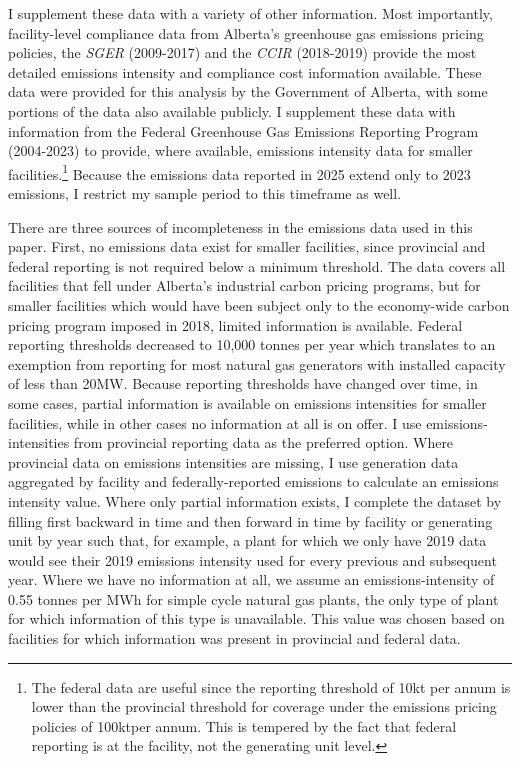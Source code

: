 \documentclass[12pt]{article}
\newcommand{\SGER}{\textit{SGER} }
\newcommand{\CCIR}{\textit{CCIR} }
\newcommand{\coe}{\text{CO$_2$e}}
\begin{document}
I supplement these data with a variety of other information.  Most importantly, facility-level compliance data from Alberta's greenhouse gas emissions pricing policies, the \SGER (2009-2017) and the \CCIR (2018-2019) provide the most detailed emissions intensity and compliance cost information available. These data were provided for this analysis by the Government of Alberta, with some portions of the data also available publicly. I supplement these data with information from the Federal Greenhouse Gas Emissions Reporting Program (2004-2023) to provide, where available, emissions intensity data for smaller facilities.\footnote{The federal data are useful since the reporting threshold of 10kt \coe per annum is lower than the provincial threshold for coverage under the emissions pricing policies of 100kt\coe per annum. This is tempered by the fact that federal reporting is at the facility, not the generating unit level.} Because the emissions data reported in 2025 extend only to 2023 emissions, I restrict my sample period to this timeframe as well. 

There are three sources of incompleteness in the emissions data used in this paper. First, no emissions data exist for smaller facilities, since provincial and federal reporting is not required below a minimum threshold. The data covers all facilities that fell under Alberta's industrial carbon pricing programs, but for smaller facilities which would have been subject only to the economy-wide carbon pricing program imposed in 2018, limited information is available. Federal reporting thresholds decreased to 10,000 tonnes per year which translates to an exemption from reporting for most natural gas generators with installed capacity of less than 20MW. Because reporting thresholds have changed over time, in some cases, partial information is available on emissions intensities for smaller facilities, while in other cases no information at all is on offer. I use emissions-intensities from provincial reporting data as the preferred option. Where provincial data on emissions intensities are missing, I use generation data aggregated by facility and federally-reported emissions to calculate an emissions intensity value. Where only partial information exists, I complete the dataset by filling first backward in time and then forward in time by facility or generating unit by year such that, for example, a plant for which we only have 2019 data would see their 2019 emissions intensity used for every previous and subsequent year. Where we have no information at all, we assume an emissions-intensity of 0.55 tonnes per MWh for simple cycle natural gas plants, the only type of plant for which information of this type is unavailable. This value was chosen based on facilities for which information was present in provincial and federal data. 
\end{document}
